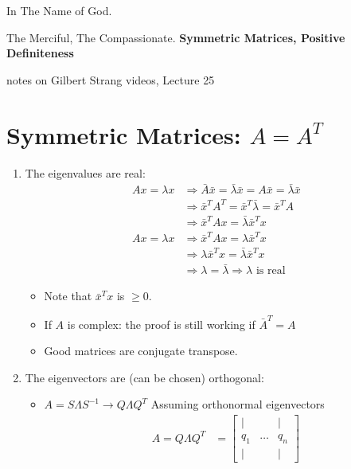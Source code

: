 \documentclass[a4paper,12pt]{article}
\theoremstyle{definition} \newtheorem{Theorem}{Theorem}
\begin{document}
\begin{center}
In The Name of God.

The Merciful, The Compassionate.
\vskip 1cm
{\Large\bfseries{Symmetric Matrices, Positive Definiteness}}

\vskip 0.2cm
\tiny{notes on Gilbert Strang videos, Lecture 25}
\end{center}

\section{Symmetric Matrices: $A=A^T$}
\begin{enumerate}
\item The eigenvalues are real:\\
	\begin{align*}
		Ax=\lambda x & \Rightarrow \bar{A}\bar{x} = \bar{\lambda}\bar{x} = A\bar{x} = \bar{\lambda}\bar{x} \\
			     & \Rightarrow \bar{x}^T A^T = \bar{x}^T \bar{\lambda} = \bar{x}^T A \\
			     & \Rightarrow \bar{x}^T A x = \bar{\lambda} \bar{x}^T x \\
	 Ax=\lambda x & \Rightarrow \bar{x}^T A x = \lambda \bar{x}^T x \\
	& \Rightarrow \lambda \bar{x}^T x = \bar{\lambda} \bar{x}^T x \\
	& \Rightarrow \lambda = \bar{\lambda} \Rightarrow \lambda \text{ is real}
		\end{align*}
		\begin{itemize}
			\item Note that $\bar{x}^T x$ is $\geq 0$.
			\item If $A$ is complex: the proof is still working if $\bar{A}^T = A$
			\item Good matrices are conjugate transpose.
		\end{itemize}
\item The eigenvectors are (can be chosen) orthogonal:
\begin{itemize}
\item $A=S\Lambda S^{-1} \rightarrow Q\Lambda Q^T$ Assuming orthonormal eigenvectors \\
\begin{align*}
	   A = Q \Lambda Q^T &= \begin{bmatrix}
					\mid &       & \mid \\
					q_1 & \ldots & q_n \\
					\mid &       & \mid 
				\end{bmatrix}

\end{align*}
\end{itemize}
\end{enumerate}
\end{document}
